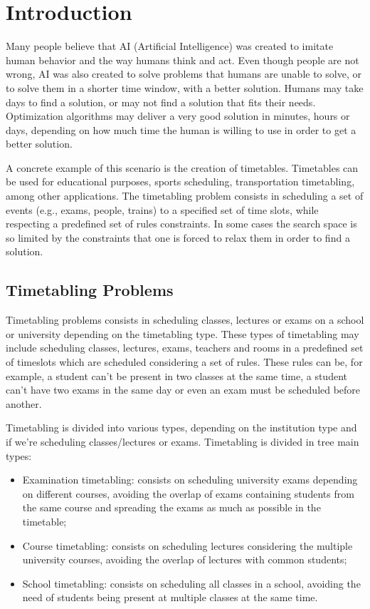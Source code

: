 \setcounter{secnumdepth}{2}
\chapter{Introduction}
\label{introduction}
\thispagestyle{plain}

Many people believe that AI (Artificial Intelligence) was created to imitate human behavior and the way humans think and act. Even though people are not wrong, AI was also created to solve problems that humans are unable to solve, or to solve them in a shorter time window, with a better solution. Humans may take days to find a solution, or may not find a solution that fits their needs. Optimization algorithms may deliver a very good solution in minutes, hours or days, depending on how much time the human is willing to use in order to get a better solution.

A concrete example of this scenario is the creation of timetables. Timetables can be used for educational purposes, sports scheduling, transportation timetabling, among other applications. The timetabling problem consists in scheduling a set of events (e.g., exams, people, trains) to a specified set of time slots, while respecting a predefined set of rules constraints. In some cases the search space is so limited by the constraints that one is forced to relax them in order to find a solution. 


\section{Timetabling Problems}

Timetabling problems consists in scheduling classes, lectures or exams on a school or university depending on the timetabling type. These types of timetabling may include scheduling classes, lectures, exams, teachers and rooms in a predefined set of timeslots which are scheduled considering a set of rules. These rules can be, for example, a student can't be present in two classes at the same time, a student can't have two exams in the same day or even an exam must be scheduled before another.

Timetabling is divided into various types, depending on the institution type and if we're scheduling classes/lectures or exams. Timetabling is divided in tree main types:

\begin{itemize}
	\item Examination timetabling: consists on scheduling university exams depending on different courses, avoiding the overlap of exams containing students from the same course and spreading the exams as much as possible in the timetable;
	\item Course timetabling: consists on scheduling lectures considering the multiple university courses, avoiding the overlap of lectures with common students;
	\item School timetabling: consists on scheduling all classes in a school, avoiding the need of students being present at multiple classes at the same time.
\end{itemize}

